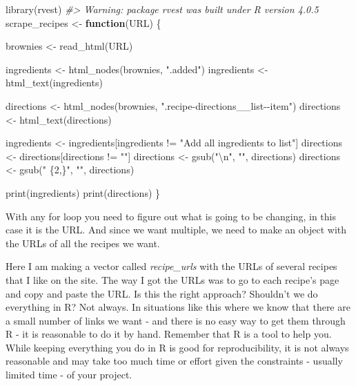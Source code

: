 \documentclass[
  12pt,
  openany]{book}
\newenvironment{Shaded}{\begin{snugshade}}{\end{snugshade}}
\newcommand{\CommentTok}[1]{\textcolor[rgb]{0.37,0.37,0.37}{\textit{#1}}}
\newcommand{\ControlFlowTok}[1]{\textcolor[rgb]{0.27,0.27,0.27}{\textbf{#1}}}
\newcommand{\FunctionTok}[1]{\textcolor[rgb]{0,0,0}{#1}}
\newcommand{\NormalTok}[1]{#1}
\newcommand{\OtherTok}[1]{\textcolor[rgb]{0.37,0.37,0.37}{#1}}
\newcommand{\SpecialCharTok}[1]{\textcolor[rgb]{0,0,0}{#1}}
\newcommand{\StringTok}[1]{\textcolor[rgb]{0.5,0.5,0.5}{#1}}
\begin{document}
\begin{Shaded}
\begin{Highlighting}[]
\FunctionTok{library}\NormalTok{(rvest)}
\CommentTok{\#\textgreater{} Warning: package \textquotesingle{}rvest\textquotesingle{} was built under R version 4.0.5}
\NormalTok{scrape\_recipes }\OtherTok{\textless{}{-}} \ControlFlowTok{function}\NormalTok{(URL) \{}
  
\NormalTok{  brownies }\OtherTok{\textless{}{-}} \FunctionTok{read\_html}\NormalTok{(URL)}
  
\NormalTok{  ingredients }\OtherTok{\textless{}{-}} \FunctionTok{html\_nodes}\NormalTok{(brownies, }\StringTok{".added"}\NormalTok{)}
\NormalTok{  ingredients }\OtherTok{\textless{}{-}} \FunctionTok{html\_text}\NormalTok{(ingredients)}
  
\NormalTok{  directions }\OtherTok{\textless{}{-}} \FunctionTok{html\_nodes}\NormalTok{(brownies, }\StringTok{".recipe{-}directions\_\_list{-}{-}item"}\NormalTok{)}
\NormalTok{  directions }\OtherTok{\textless{}{-}} \FunctionTok{html\_text}\NormalTok{(directions)}
  
\NormalTok{  ingredients }\OtherTok{\textless{}{-}}\NormalTok{ ingredients[ingredients }\SpecialCharTok{!=} \StringTok{"Add all ingredients to list"}\NormalTok{]}
\NormalTok{  directions  }\OtherTok{\textless{}{-}}\NormalTok{ directions[directions }\SpecialCharTok{!=} \StringTok{""}\NormalTok{]}
\NormalTok{  directions  }\OtherTok{\textless{}{-}} \FunctionTok{gsub}\NormalTok{(}\StringTok{"}\SpecialCharTok{\textbackslash{}n}\StringTok{"}\NormalTok{, }\StringTok{""}\NormalTok{, directions)}
\NormalTok{  directions  }\OtherTok{\textless{}{-}} \FunctionTok{gsub}\NormalTok{(}\StringTok{" \{2,\}"}\NormalTok{, }\StringTok{""}\NormalTok{, directions)}
  
  \FunctionTok{print}\NormalTok{(ingredients)}
  \FunctionTok{print}\NormalTok{(directions)}
\NormalTok{\}}
\end{Highlighting}
\end{Shaded}

With any for loop you need to figure out what is going to be changing, in this case it is the URL. And since we want multiple, we need to make an object with the URLs of all the recipes we want.

Here I am making a vector called \emph{recipe\_urls} with the URLs of several recipes that I like on the site. The way I got the URLs was to go to each recipe's page and copy and paste the URL. Is this the right approach? Shouldn't we do everything in R? Not always. In situations like this where we know that there are a small number of links we want - and there is no easy way to get them through R - it is reasonable to do it by hand. Remember that R is a tool to help you. While keeping everything you do in R is good for reproducibility, it is not always reasonable and may take too much time or effort given the constraints - usually limited time - of your project.
\end{document}
